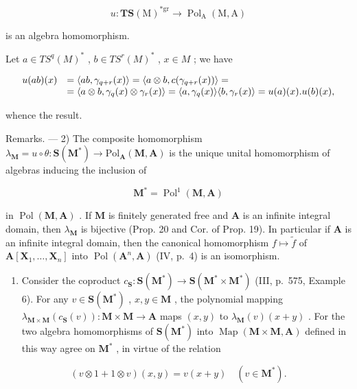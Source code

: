 \[
u: \mathbf {T S} (\mathrm{M}) ^ {* \mathrm{gr}} \rightarrow \operatorname{Pol} _ {\mathrm{A}} (\mathrm{M}, \mathrm{A})
\]

is an algebra homomorphism.

Let \(a \in TS^{q}(M)^{*}\) , \(b \in TS^{r}(M)^{*}\) , \(x \in M\) ; we have

\[
\begin{array}{r l} u (a b) (x) & = \langle a b, \gamma_ {q + r} (x) \rangle = \langle a \otimes b, c (\gamma_ {q + r} (x)) \rangle = \\ & = \langle a \otimes b, \gamma_ {q} (x) \otimes \gamma_ {r} (x) \rangle = \langle a, \gamma_ {q} (x) \rangle \langle b, \gamma_ {r} (x) \rangle = u (a) (x). u (b) (x), \end{array}
\]

whence the result.

Remarks. --- 2) The composite homomorphism \(\lambda_{\mathbf{M}}=u\circ\theta:\mathbf{S}(\mathbf{M}^{*})\to\mathrm{Pol}_{\mathbf{A}}(\mathbf{M},\mathbf{A})\) is the unique unital homomorphism of algebras inducing the inclusion of

\[
\mathbf {M} ^ {*} = \operatorname{Pol} ^ {1} (\mathbf {M}, \mathbf {A})
\]

in \(\operatorname{Pol}(\mathbf{M}, \mathbf{A})\) . If \(\mathbf{M}\) is finitely generated free and \(\mathbf{A}\) is an infinite integral domain, then \(\lambda_{\mathbf{M}}\) is bijective (Prop. 20 and Cor. of Prop. 19). In particular if \(\mathbf{A}\) is an infinite integral domain, then the canonical homomorphism \(f \mapsto \tilde{f}\) of \(\mathbf{A}[\mathbf{X}_1, \ldots, \mathbf{X}_n]\) into \(\operatorname{Pol}(\mathbf{A}^n, \mathbf{A})\) (IV, p.~4) is an isomorphism.

\begin{enumerate}
\def\labelenumi{\arabic{enumi})}
\setcounter{enumi}{2}
\tightlist
\item
  Consider the coproduct \(c_{\mathbf{S}}: \mathbf{S}(\mathbf{M}^{*}) \to \mathbf{S}(\mathbf{M}^{*} \times \mathbf{M}^{*})\) (III, p.~575, Example 6). For any \(v \in \mathbf{S}(\mathbf{M}^{*})\) , \(x, y \in \mathbf{M}\) , the polynomial mapping \(\lambda_{\mathbf{M} \times \mathbf{M}}(c_{\mathbf{S}}(v)): \mathbf{M} \times \mathbf{M} \to \mathbf{A}\) maps \((x, y)\) to \(\lambda_{\mathbf{M}}(v)(x + y)\) . For the two algebra homomorphisms of \(\mathbf{S}(\mathbf{M}^{*})\) into \(\operatorname{Map}(\mathbf{M} \times \mathbf{M}, \mathbf{A})\) defined in this way agree on \(\mathbf{M}^{*}\) , in virtue of the relation
\end{enumerate}

\[
(v \otimes 1 + 1 \otimes v) (x, y) = v (x + y) \quad (v \in \mathbf {M} ^ {*}).
\]

